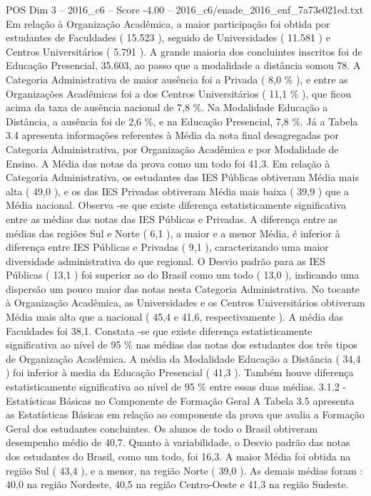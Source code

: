 \begin{textsample}{POS Dim 3 – 2016\_c6 – Score -4.00 – 2016\_c6/enade\_2016\_enf\_7a73e021ed.txt}
Em relação à Organização Acadêmica, a maior participação foi obtida por estudantes de Faculdades ( 15.523 ), seguido de Universidades ( 11.581 ) e Centros Universitários ( 5.791 ).
A grande maioria dos concluintes inscritos foi de Educação Presencial, 35.603, ao passo que a modalidade a distância somou 78.
A Categoria Administrativa de maior ausência foi a Privada ( 8,0 \% ), e entre as Organizações Acadêmicas foi a dos Centros Universitários ( 11,1 \% ), que ficou acima da taxa de ausência nacional de 7,8 \%.
Na Modalidade Educação a Distância, a ausência foi de 2,6 \%, e na Educação Presencial, 7,8 \%.
Já a Tabela 3.4 apresenta informações referentes à Média da nota final desagregadas por Categoria Administrativa, por Organização Acadêmica e por Modalidade de Ensino.
A Média das notas da prova como um todo foi 41,3.
Em relação à Categoria Administrativa, os estudantes das IES Públicas obtiveram Média mais alta ( 49,0 ), e os das IES Privadas obtiveram Média mais baixa ( 39,9 ) que a Média nacional.
Observa -se que existe diferença estatisticamente significativa entre as médias das notas das IES Públicas e Privadas.
A diferença entre as médias das regiões Sul e Norte ( 6,1 ), a maior e a menor Média, é inferior à diferença entre IES Públicas e Privadas ( 9,1 ), caracterizando uma maior diversidade administrativa do que regional.
O Desvio padrão para as IES Públicas ( 13,1 ) foi superior ao do Brasil como um todo ( 13,0 ), indicando uma dispersão um pouco maior das notas nesta Categoria Administrativa.
No tocante à Organização Acadêmica, as Universidades e os Centros Universitários obtiveram Média mais alta que a nacional ( 45,4 e 41,6, respectivamente ).
A média das Faculdades foi 38,1.
Constata -se que existe diferença estatisticamente significativa ao nível de 95 \% nas médias das notas dos estudantes dos três tipos de Organização Acadêmica.
A média da Modalidade Educação a Distância ( 34,4 ) foi inferior à media da Educação Presencial ( 41,3 ).
Também houve diferença estatisticamente significativa ao nível de 95 \% entre essas duas médias. 3.1.2 - Estatísticas Básicas no Componente de Formação Geral A Tabela 3.5 apresenta as Estatísticas Básicas em relação ao componente da prova que avalia a Formação Geral dos estudantes concluintes.
Os alunos de todo o Brasil obtiveram desempenho médio de 40,7.
Quanto à variabilidade, o Desvio padrão das notas dos estudantes do Brasil, como um todo, foi 16,3.
A maior Média foi obtida na região Sul ( 43,4 ), e a menor, na região Norte ( 39,0 ).
As demais médias foram : 40,0 na região Nordeste, 40,5 na região Centro-Oeste e 41,3 na região Sudeste.

\end{textsample}
